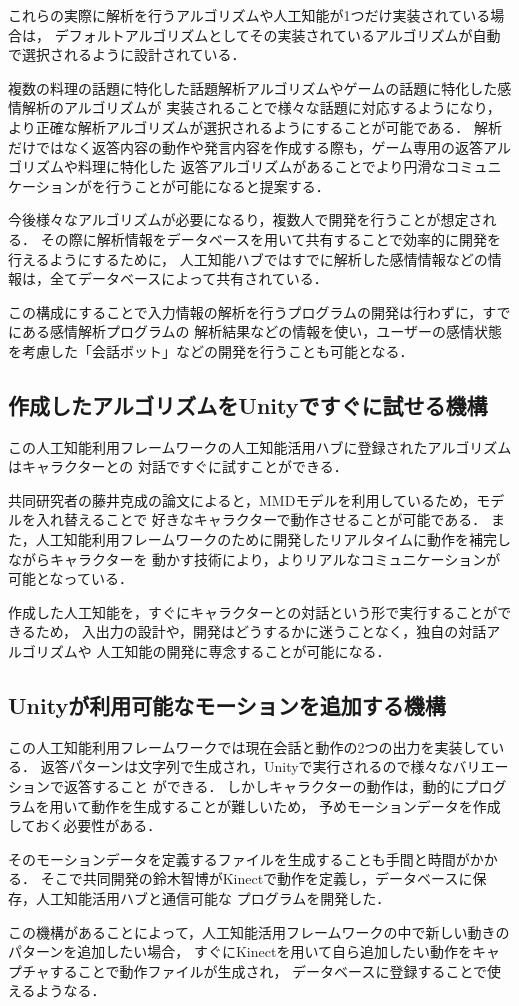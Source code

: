 これらの実際に解析を行うアルゴリズムや人工知能が1つだけ実装されている場合は，
デフォルトアルゴリズムとしてその実装されているアルゴリズムが自動で選択されるように設計されている．

複数の料理の話題に特化した話題解析アルゴリズムやゲームの話題に特化した感情解析のアルゴリズムが
実装されることで様々な話題に対応するようになり，より正確な解析アルゴリズムが選択されるようにすることが可能である．
解析だけではなく返答内容の動作や発言内容を作成する際も，ゲーム専用の返答アルゴリズムや料理に特化した
返答アルゴリズムがあることでより円滑なコミュニケーションがを行うことが可能になると提案する．

今後様々なアルゴリズムが必要になるり，複数人で開発を行うことが想定される．
その際に解析情報をデータベースを用いて共有することで効率的に開発を行えるようにするために，
人工知能ハブではすでに解析した感情情報などの情報は，全てデータベースによって共有されている．

この構成にすることで入力情報の解析を行うプログラムの開発は行わずに，すでにある感情解析プログラムの
解析結果などの情報を使い，ユーザーの感情状態を考慮した「会話ボット」などの開発を行うことも可能となる．
\subsection{作成したアルゴリズムをUnityですぐに試せる機構}
この人工知能利用フレームワークの人工知能活用ハブに登録されたアルゴリズムはキャラクターとの
対話ですぐに試すことができる．

共同研究者の藤井克成の論文\cite{fuji}によると，MMDモデルを利用しているため，モデルを入れ替えることで
好きなキャラクターで動作させることが可能である．
また，人工知能利用フレームワークのために開発したリアルタイムに動作を補完しながらキャラクターを
動かす技術により，よりリアルなコミュニケーションが可能となっている．

作成した人工知能を，すぐにキャラクターとの対話という形で実行することができるため，
入出力の設計や，開発はどうするかに迷うことなく，独自の対話アルゴリズムや
人工知能の開発に専念することが可能になる．
\subsection{Unityが利用可能なモーションを追加する機構}
この人工知能利用フレームワークでは現在会話と動作の2つの出力を実装している．
返答パターンは文字列で生成され，Unityで実行されるので様々なバリエーションで返答すること
ができる．
しかしキャラクターの動作は，動的にプログラムを用いて動作を生成することが難しいため，
予めモーションデータを作成しておく必要性がある．

そのモーションデータを定義するファイルを生成することも手間と時間がかかる．
そこで共同開発の鈴木智博がKinectで動作を定義し，データベースに保存，人工知能活用ハブと通信可能な
プログラムを開発した\cite{suzuki}．

この機構があることによって，人工知能活用フレームワークの中で新しい動きのパターンを追加したい場合，
すぐにKinectを用いて自ら追加したい動作をキャプチャすることで動作ファイルが生成され，
データベースに登録することで使えるようなる．